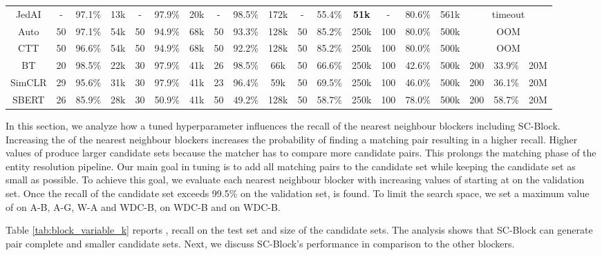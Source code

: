 \documentclass[sigconf,nonacm]{acmart}
\begin{document}
\begin{table*}[ht]
\begin{tabular}{@{}c|ccc|ccc|ccc|ccc|ccc|ccc}
JedAI       & -  & 97.1\%  & 13k & -  & 97.9\%  & 20k & -  & 98.5\% & 172k & - & 55.4\% & \textbf{51k} & - & 80.6\% & 561k &                      \multicolumn{3}{c}{timeout}     \\
Auto        & 50 & 97.1\%  & 54k & 50 & 94.9\%  & 68k & 50 & 93.3\% & 128k & 50 & 85.2\% & 250k & 100 & 80.0\% & 500k &                       \multicolumn{3}{c}{OOM}                            \\
CTT         & 50 & 96.6\%  & 54k & 50 & 94.9\%  & 68k & 50 & 92.2\% & 128k & 50 & 85.2\% & 250k  & 100 & 80.0\% & 500k & \multicolumn{3}{c}{OOM} \\
BT & 20 & 98.5\%  & 22k & 30 & 97.9\%  & 41k & 26 & 98.5\% & 66k  & 50                   & 66.6\%               & 250k               & 100                  & 42.6\%               & 500k               &                       200 & 33.9\% & 20M                            \\
SimCLR      & 29 & 95.6\%  & 31k & 30 & 97.9\%  & 41k & 23 & 96.4\% & 59k  & 50                   & 69.5\%               & 250k               & 100                  & 46.0\%               & 500k               &                       200 & 36.1\% & 20M                        \\
SBERT       & 26 & 85.9\%  & 28k & 30 & 50.9\%  & 41k & 50 & 49.2\% & 128k & 50 & 58.7\% & 250k  & 100 & 78.0\% & 500k & 200 & 58.7\% & 20M                             \\
 \bottomrule
\end{tabular}
\end{table*}

In this section, we analyze how a tuned hyperparameter  influences the recall of the nearest neighbour blockers including SC-Block.
Increasing the  of the nearest neighbour blockers increases the probability of finding a matching pair resulting in a higher recall.
Higher values of  produce larger candidate sets because the matcher has to compare more candidate pairs. This prolongs the matching phase of the entity resolution pipeline.
Our main goal in tuning  is to add all matching pairs to the candidate set while keeping the candidate set as small as possible.
To achieve this goal, we evaluate each nearest neighbour blocker with increasing values of  starting at  on the validation set.
Once the recall of the candidate set exceeds 99.5\% on the validation set,  is found.
To limit the search space, we set a maximum value of  on A-B, A-G, W-A and WDC-B,   on WDC-B and  on WDC-B.

Table \ref{tab:block_variable_k} reports , recall on the test set and size of the candidate sets. 
The analysis shows that SC-Block can generate pair complete and smaller candidate sets. Next, we discuss SC-Block's performance in comparison to the other blockers.
\end{document}
